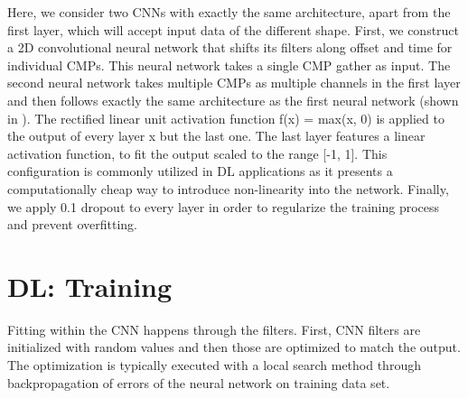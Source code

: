 \documentclass[manuscript]{geophysics}
\begin{document}
Here, we consider two CNNs with exactly the same architecture, apart from the first layer, which will accept input data of the different shape.
%
First, we construct a 2D convolutional neural network that shifts its filters along offset and time for individual CMPs. This neural network takes a single CMP gather as input.
The second neural network takes multiple CMPs as multiple channels in the first layer and then follows exactly the same architecture as the first neural network (shown in ).
The rectified linear unit activation function 
\beq
f(x) = max(x, 0)
\eeq
is applied to the output of every layer x but the last one. The last layer features a linear activation function, to fit the output scaled to the range [-1, 1]. This configuration is commonly utilized in DL applications as it presents a computationally cheap way to introduce non-linearity into the network. 
Finally, we apply 0.1 dropout to every layer in order to regularize the training process and prevent overfitting. 







\section{DL: Training}
Fitting within the CNN happens through the filters. First, CNN filters are initialized with random values and then those are optimized to match the output. The optimization is typically executed with a local search method through backpropagation of errors of the neural network on training data set. 
\end{document}

